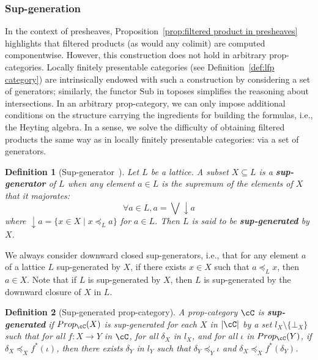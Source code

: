 \documentclass[preprint,3p,times]{elsarticle}
\newtheorem{definition}{Definition}[section]
\newcommand{\Sub}{\mathrm{Sub}}
\begin{document}
\subsubsection{Sup-generation}

In the context of presheaves, Proposition~\ref{prop:filtered product in presheaves} highlights that filtered products (as would any colimit) are computed componentwise. However, this construction does not hold in arbitrary prop-categories. Locally finitely presentable categories (see Definition~\ref{def:lfp category}) are intrinsically endowed with such a construction by considering a set of generators; similarly, the functor \(\Sub\) in toposes simplifies the reasoning about intersections. In an arbitrary prop-category, we can only impose additional conditions on the structure carrying the ingredients for building the formulas, i.e., the Heyting algebra. In a sense, we solve the difficulty of obtaining filtered products the same way as in locally finitely presentable categories: via a set of generators.

\begin{definition}[Sup-generator~\cite{serra_connectivity_1998}]
\label{def:supgenerator}
    Let \(L\) be a lattice. A subset \(X \subseteq L\) is a {\bf sup-generator} of \(L\) when any element \(a \in L\) is the supremum of the elements of \(X\) that it majorates: 
    \[
    \forall a \in L, a = \bigvee \downarrow\!a
    \]
    where $\downarrow\!a = \{x \in X \mid x \preceq_L a\}$ for $a \in L$.
    Then \(L\) is said to be {\bf sup-generated} by \(X\).
\end{definition}

We always consider downward closed sup-generators, i.e., that for any element \(a\) of a lattice \(L\) sup-generated by \(X\), if there exists \(x \in X\) such that \(a \preceq_L x\), then \(a \in X\). Note that if \(L\) is sup-generated by \(X\), then \(L\) is sup-generated by the downward closure of \(X\) in \(L\). 

\begin{definition}[Sup-generated prop-category]
\label{def:is supgenerated}
    A prop-category $\cC$ is {\bf sup-generated} if \(Prop_\cC(X)\) is sup-generated for each \(X\) in \(|\cC|\) by a set \(l_X \setminus \{\bot_X\}\)
    such that for all \(f:X \to Y\) in \(\cC\), for all \(\delta_X\) in \(l_X\), and for all \(\iota\) in \(Prop_\cC(Y)\), if \(\delta_X \preceq_X f^*(\iota)\), then there exists \(\delta_Y\) in \(l_Y\) such that \(\delta_Y \preceq_Y \iota\) and \(\delta_X \preceq_X f^*(\delta_Y)\).
\end{definition}
\end{document}
